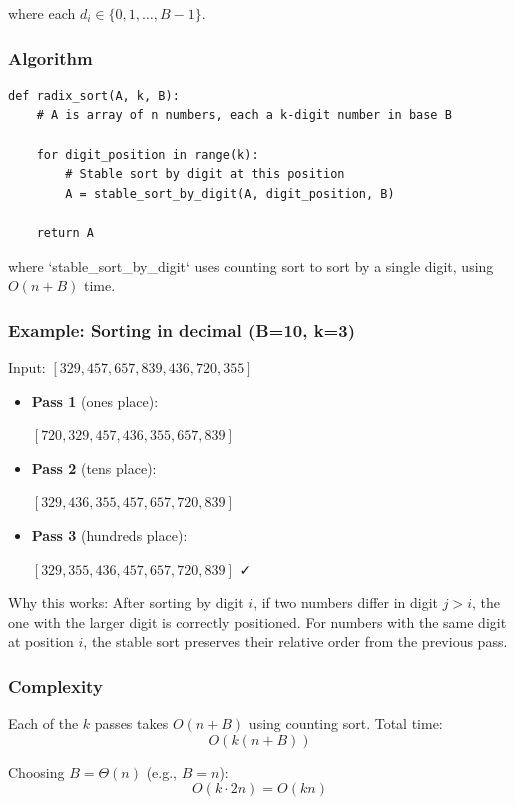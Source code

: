 \documentclass[11pt]{article}
\begin{document}
where each $d_i \in \{0, 1, \ldots, B-1\}$.

\subsubsection*{Algorithm}
\begin{lstlisting}
def radix_sort(A, k, B):
    # A is array of n numbers, each a k-digit number in base B
    
    for digit_position in range(k):
        # Stable sort by digit at this position
        A = stable_sort_by_digit(A, digit_position, B)
    
    return A
\end{lstlisting}

where `stable_sort_by_digit` uses counting sort to sort by a single digit, using $O(n + B)$ time.

\subsubsection*{Example: Sorting in decimal (B=10, k=3)}
Input: $[329, 457, 657, 839, 436, 720, 355]$

\begin{itemize}
\item \textbf{Pass 1} (ones place):
  
  $[720, 329, 457, 436, 355, 657, 839]$
  
\item \textbf{Pass 2} (tens place):
  
  $[329, 436, 355, 457, 657, 720, 839]$
  
\item \textbf{Pass 3} (hundreds place):
  
  $[329, 355, 436, 457, 657, 720, 839]$ ✓
\end{itemize}

Why this works: After sorting by digit $i$, if two numbers differ in digit $j > i$, the one with the larger digit is correctly positioned. For numbers with the same digit at position $i$, the stable sort preserves their relative order from the previous pass.

\subsubsection*{Complexity}
Each of the $k$ passes takes $O(n + B)$ using counting sort. Total time:
\[
O(k(n + B))
\]

Choosing $B = \Theta(n)$ (e.g., $B = n$):
\[
O(k \cdot 2n) = O(kn)
\]
\end{document}
